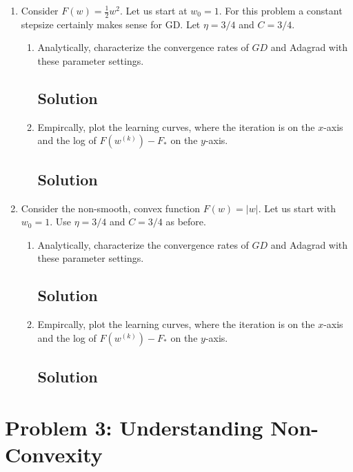 \documentclass[letterpaper,11pt]{article}
\begin{document}
\begin{enumerate}
\item Consider $F(w) = \frac{1}{2}w^2$. Let us start at $w_0 = 1$. For this
  problem a constant stepsize certainly makes sense for GD. Let $\eta = 3/4$ and
  $C = 3/4$.

  \begin{enumerate}
  \item Analytically, characterize the convergence rates of $GD$ and Adagrad
    with these parameter settings.

    \subsection*{Solution}
  \item Empircally, plot the learning curves, where the iteration is on the
    $x$-axis and the log of $F\left(w^{(k)}\right) - F_*$ on the $y$-axis.

    \subsection*{Solution}
  \end{enumerate}
  
\item Consider the non-smooth, convex function $F(w) = \lvert w \rvert$. Let us
  start with $w_0 = 1$. Use $\eta = 3/4$ and $C = 3/4$ as before.

  \begin{enumerate}
  \item Analytically, characterize the convergence rates of $GD$ and Adagrad
    with these parameter settings.

    \subsection*{Solution}
  \item Empircally, plot the learning curves, where the iteration is on the
    $x$-axis and the log of $F\left(w^{(k)}\right) - F_*$ on the $y$-axis.

    \subsection*{Solution}
  \end{enumerate}
\end{enumerate}

\section*{Problem 3: Understanding Non-Convexity}
\end{document}

